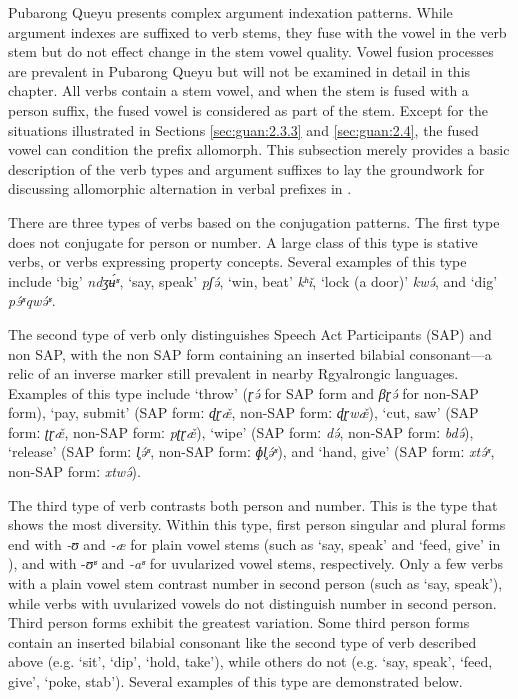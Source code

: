 \documentclass[output=paper]{langscibook}
\begin{document}
Pubarong Queyu presents complex argument indexation patterns. While argument indexes are suffixed to verb stems, they fuse with the vowel in the verb stem but do not effect change in the stem vowel quality. Vowel fusion processes are prevalent in Pubarong Queyu but will not be examined in detail in this chapter. All verbs contain a stem vowel, and when the stem is fused with a person suffix, the fused vowel is considered as part of the stem. Except for the situations illustrated in Sections \ref{sec:guan:2.3.3} and \ref{sec:guan:2.4}, the fused vowel can condition the prefix allomorph. This subsection merely provides a basic description of the verb types and argument suffixes to lay the groundwork for discussing allomorphic alternation in verbal prefixes in .

There are three types of verbs based on the conjugation patterns. The first type does not conjugate for person or number. A large class of this type is stative verbs, or verbs expressing property concepts. Several examples of this type include ‘big’ \textit{ndʒʉ́ʶ}, ‘say, speak’ \textit{pʃə́}, ‘win, beat’ \textit{kʰǐ}, ‘lock (a door)’ \textit{kwə́}, and ‘dig’ \textit{pɘ́ʶqwə́ʶ}. 

The second type of verb only distinguishes Speech Act Participants (SAP) and non SAP, with the non SAP form containing an inserted bilabial consonant—a relic of an inverse marker still prevalent in nearby Rgyalrongic languages. Examples of this type include ‘throw’ (\textit{ɽə́} for SAP form and \textit{βɽə́} for non-SAP form), ‘pay, submit’ (SAP formː \textit{ɖɽæ̌}, non-SAP formː \textit{ɖɽwæ̌}), ‘cut, saw’ (SAP formː \textit{ʈɽæ̌}, non-SAP formː \textit{pʈɽæ̌}), ‘wipe’ (SAP formː \textit{də́}, non-SAP formː \textit{bdə́}), ‘release’ (SAP formː \textit{l̥ə́ʶ}, non-SAP formː \textit{ɸl̥ə́ʶ}), and ‘hand, give’ (SAP formː \textit{xtə́ʶ}, non-SAP formː \textit{xtwə́}). 

The third type of verb contrasts both person and number. This is the type that shows the most diversity. Within this type, first person singular and plural forms end with \textit{{}-ʊ} and \textit{{}-æ} for plain vowel stems (such as ‘say, speak’ and ‘feed, give’ in ), and with {}-\textit{ʊʶ} and \textit{{}-aʶ} for uvularized vowel stems, respectively. Only a few verbs with a plain vowel stem contrast number in second person (such as ‘say, speak’), while verbs with uvularized vowels do not distinguish number in second person. Third person forms exhibit the greatest variation. Some third person forms contain an inserted bilabial consonant like the second type of verb described above (e.g. ‘sit’, ‘dip’, ‘hold, take’), while others do not (e.g. ‘say, speak’, ‘feed, give’, ‘poke, stab’). Several examples of this type are demonstrated below.
\end{document}
